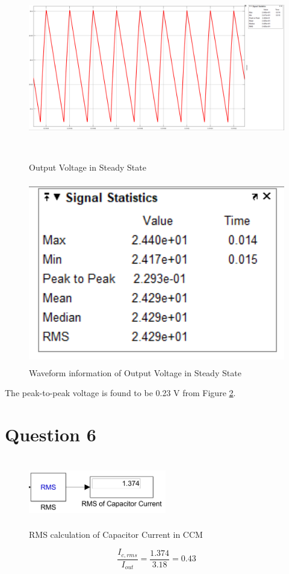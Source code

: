 \documentclass[oneside,12pt]{article}
\begin{document}
\begin{figure}[H]
	\centering
	\includegraphics[width=14cm, height=8cm]{"q5/peak to peak output voltage"}
	\caption{Output Voltage in Steady State}
	\label{fig:peak-to-peak-output-voltage}
\end{figure}

\begin{figure}[H]
	\centering
	\includegraphics[width=14cm, height=8cm]{q5/statistics}
	\caption{Waveform information of Output Voltage in Steady State}
	\label{fig:statistics}
\end{figure}

The peak-to-peak voltage is found to be 0.23 V from Figure \ref{fig:statistics}.

\newpage\section{Question 6}



\begin{figure}[H]
	\centering
	\includegraphics[width=6cm, height=3cm]{"q6/rmscalc"}
	\caption{RMS calculation of Capacitor Current in CCM }
	\label{fig:ekran-alnts}
\end{figure}

\begin{equation}
	\dfrac{I_{c,rms}}{I_{out}}=\dfrac{1.374}{3.18}= 0.43
\end{equation}
\end{document}
